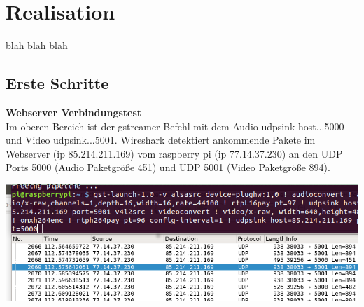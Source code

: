 \newpage
\section{Realisation}

blah blah blah

\subsection{Erste Schritte}




\textbf{Webserver Verbindungstest}\\
Im oberen Bereich ist der gstreamer Befehl mit dem Audio udpsink host...5000 und Video udpsink...5001. Wireshark detektiert ankommende Pakete im Webserver (ip 85.214.211.169) vom raspberry pi (ip 77.14.37.230) an den UDP Ports 5000 (Audio Paketgröße 451) und UDP 5001 (Video Paketgröße 894).\\

\begin{minipage}{\textwidth}
    \begin{center}
        \includegraphics[scale=0.85]{img/wireshark.png} 
    \end{center}
\end{minipage}



